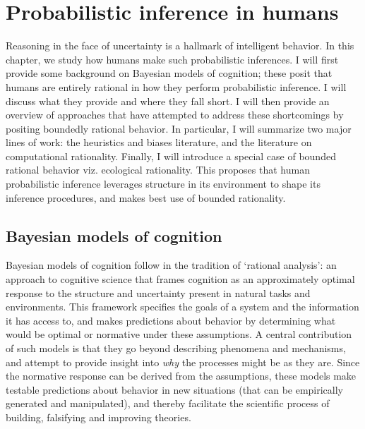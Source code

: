 

\chapter{Probabilistic inference in humans}
\label{chap:psych}

Reasoning in the face of uncertainty is a hallmark of intelligent behavior. In this chapter, we study how humans make such probabilistic inferences. I will first provide some background on Bayesian models of cognition; these posit that humans are entirely rational in how they perform probabilistic inference. I will discuss what they provide and where they fall short. I will then provide an overview of approaches that have attempted to address these shortcomings by positing boundedly rational behavior. In particular, I will summarize two major lines of work: the heuristics and biases literature, and the literature on computational rationality. Finally, I will introduce a special case of bounded rational behavior viz. ecological rationality. This proposes that human probabilistic inference leverages structure in its environment to shape its inference procedures, and makes best use of bounded rationality.

\section{Bayesian models of cognition}
Bayesian models of cognition follow in the tradition of `rational analysis'\cite{shepard1987toward, anderson1990adaptive}: an approach to cognitive science that frames cognition as an approximately optimal response to the structure and uncertainty present in natural tasks and environments. This framework specifies the goals of a system and the information it has access to, and makes predictions about behavior by determining what would be optimal or normative under these assumptions. A central contribution of such models is that they go beyond describing phenomena and mechanisms, and attempt to provide insight into \textit{why} the processes might be as they are. Since the normative response can be derived from the assumptions, these models make testable predictions about behavior in new situations (that can be empirically generated and manipulated), and thereby facilitate the scientific process of building, falsifying and improving theories.


